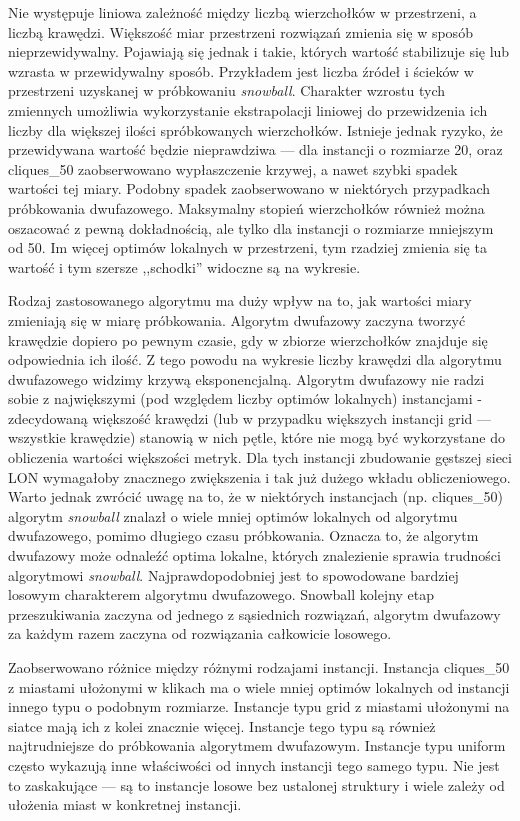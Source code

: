 Nie występuje liniowa zależność między liczbą wierzchołków w przestrzeni, a liczbą krawędzi.
Większość miar przestrzeni rozwiązań zmienia się w sposób nieprzewidywalny.
Pojawiają się jednak i takie, których wartość stabilizuje się lub wzrasta w przewidywalny sposób.
Przykładem jest liczba źródeł i ścieków w przestrzeni uzyskanej w próbkowaniu \textit{snowball}.
Charakter wzrostu tych zmiennych umożliwia wykorzystanie ekstrapolacji liniowej do przewidzenia ich liczby
dla większej ilości spróbkowanych wierzchołków.
Istnieje jednak ryzyko, że przewidywana wartość będzie nieprawdziwa --- dla instancji o rozmiarze 20, oraz cliques\_50
zaobserwowano wypłaszczenie krzywej, a nawet szybki spadek wartości tej miary.
Podobny spadek zaobserwowano w niektórych przypadkach próbkowania dwufazowego.
Maksymalny stopień wierzchołków również można oszacować z pewną dokładnością, ale tylko dla instancji o rozmiarze mniejszym od 50.
Im więcej optimów lokalnych w przestrzeni, tym rzadziej zmienia się ta wartość i tym szersze ,,schodki'' widoczne są na wykresie.

Rodzaj zastosowanego algorytmu ma duży wpływ na to, jak wartości miary zmieniają się w miarę próbkowania.
Algorytm dwufazowy zaczyna tworzyć krawędzie dopiero po pewnym czasie, gdy w zbiorze wierzchołków znajduje się
odpowiednia ich ilość. Z tego powodu na wykresie liczby krawędzi dla algorytmu dwufazowego widzimy krzywą eksponencjalną.
Algorytm dwufazowy nie radzi sobie z największymi (pod względem liczby optimów lokalnych) instancjami
- zdecydowaną większość krawędzi (lub w przypadku większych instancji grid --- wszystkie krawędzie) stanowią w nich pętle,
które nie mogą być wykorzystane do obliczenia wartości większości metryk.
Dla tych instancji zbudowanie gęstszej sieci LON wymagałoby znacznego zwiększenia i tak już dużego wkładu obliczeniowego.
Warto jednak zwrócić uwagę na to, że w niektórych instancjach (np. cliques\_50) algorytm \textit{snowball} znalazł o wiele mniej
optimów lokalnych od algorytmu dwufazowego, pomimo długiego czasu próbkowania.
Oznacza to, że algorytm dwufazowy może odnaleźć optima lokalne, których znalezienie sprawia trudności algorytmowi \textit{snowball}.
Najprawdopodobniej jest to spowodowane bardziej losowym charakterem algorytmu dwufazowego.
Snowball kolejny etap przeszukiwania zaczyna od jednego z sąsiednich rozwiązań, algorytm dwufazowy
za każdym razem zaczyna od rozwiązania całkowicie losowego.

Zaobserwowano różnice między różnymi rodzajami instancji.
Instancja cliques\_50 z miastami ułożonymi w klikach ma o wiele mniej optimów lokalnych od instancji innego typu o podobnym rozmiarze.
Instancje typu grid z miastami ułożonymi na siatce mają ich z kolei znacznie więcej.
Instancje tego typu są również najtrudniejsze do próbkowania algorytmem dwufazowym.
Instancje typu uniform często wykazują inne właściwości od innych instancji tego samego typu.
Nie jest to zaskakujące --- są to instancje losowe bez ustalonej struktury i wiele zależy od ułożenia miast w konkretnej instancji.

